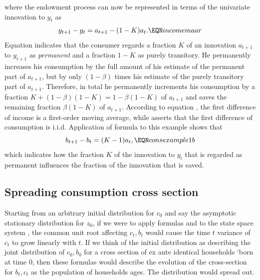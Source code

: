 where the endowment process can now be represented in terms of the univariate innovation to $y_t$ as
$$ y_{t+1} - y_t = a_{t+1} - (1-K) a_t. \EQN incomemaar $$
Equation  indicates that the consumer regards a fraction $K$ of an innovation $a_{t+1}$ to $y_{t+1}$
as {\it permanent} and a fraction $1-K$ as purely transitory. He permanently increases his consumption by the full amount of his estimate of the permanent part of $a_{t+1}$,
but by only $(1-\beta)$ times his estimate of the purely transitory part of $a_{t+1}$.   Therefore, in total  he permanently increments his  consumption by
 a fraction $K + (1-\beta) (1-K) = 1 - \beta (1-K)$  of $a_{t+1}$ and saves the remaining fraction $\beta (1-K)$ of $a_{t+1}$.
  According to equation , the first difference of income is a first-order moving average, while 
  asserts that the first difference of consumption is   i.i.d.
  Application of formula 
to this example shows that
$$ b_{t+1} - b_t = (K-1) a_t , \EQN consexample1b $$
which indicates how the fraction $K$ of the innovation to $y_t$ that is regarded as permanent influences the fraction of the innovation that is saved.



\subsection{Spreading consumption cross section}

Starting from an arbitrary initial distribution for $c_0$ and say the asymptotic stationary  distribution for $z_0$, if we were to apply formulas  and  to the state space system ,
the common  unit root affecting $c_t, b_t$ would cause  the time $t$ variance of $c_t$ to grow linearly with $t$.
If we think of the initial distribution as describing the joint distribution of $c_0, b_0$ for a cross section
of ex ante identical households `born at time $0$, then these formulas would describe the evolution of the cross-section
for $b_t, c_t$ as the population of households ages.  The distribution would spread out.

